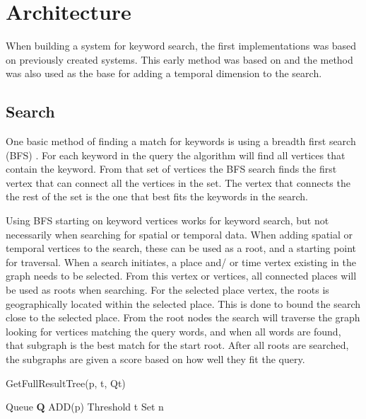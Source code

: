 \chapter{Architecture}
\label{cha:architecture}

When building a system for keyword search, the first implementations was based on previously created systems. This early method was based on \cite{Shi:2016:TRS:2882903.2882941} and the method was also used as the base for adding a temporal dimension to the search.

\section{Search}
One basic method of finding a match for keywords is using a breadth first search (BFS) \citep{blinks, Shi:2016:TRS:2882903.2882941}. For each keyword in the query the algorithm will find all vertices that contain the keyword. From that set of vertices the BFS search finds the first vertex that can connect all the vertices in the set. The vertex that connects the the rest of the set is the one that best fits the keywords in the search.

Using BFS starting on keyword vertices works for keyword search, but not necessarily when searching for spatial or temporal data. When adding spatial or temporal vertices to the search, these can be used as a root, and a starting point for traversal. When a search initiates, a place and/ or time vertex existing in the graph needs to be selected. From this vertex or vertices, all connected places will be used as roots when searching. For the selected place vertex, the roots is geographically located within the selected place. This is done to bound the search close to the selected place. From the root nodes the search will traverse the graph looking for vertices matching the query words, and when all words are found, that subgraph is the best match for the start root. After all roots are searched, the subgraphs are given a score based on how well they fit the query.

\begin{algorithm}[H]
    \caption{GetFullResultTree(p, t, Qt)}
    \SetAlgoLined
    Queue $\mathbf{Q}$ ADD(p)\; Threshold t\; Set n \;
\end{algorithm}

